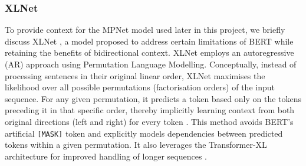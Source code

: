 \documentclass[10pt,oneside]{report}
\begin{document}
\subsubsection{XLNet}

%

To provide context for the MPNet model used later in this project, we briefly discuss XLNet \cite{yang2019xlnet}, a model proposed to address certain limitations of BERT while retaining the benefits of bidirectional context. XLNet employs an autoregressive (AR) approach using Permutation Language Modelling. Conceptually, instead of processing sentences in their original linear order, XLNet maximises the likelihood over all possible permutations (factorisation orders) of the input sequence. For any given permutation, it predicts a token based only on the tokens preceding it in that specific order, thereby implicitly learning context from both original directions (left and right) for every token \cite{yang2019xlnet}. This method avoids BERT's artificial \texttt{[MASK]} token and explicitly models dependencies between predicted tokens within a given permutation. It also leverages the Transformer-XL architecture for improved handling of longer sequences \cite{dai2019transformer}.
\end{document}
